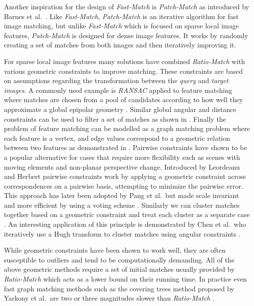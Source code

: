 \documentclass[runningheads]{llncs}
\begin{document}
Another inspiration for the design of \emph{Fast-Match} is \emph{Patch-Match} as introduced by Barnes et al.~\cite{barnes2009patchmatch}. Like \emph{Fast-Match}, \emph{Patch-Match} is an iterative algorithm for fast image matching, but unlike \emph{Fast-Match} which is focused on sparse local image features, \emph{Patch-Match} is designed for dense image features. It works by randomly creating a set of matches from both images and then iteratively improving it.

For sparse local image features many solutions have combined \emph{Ratio-Match} with various geometric constraints to improve matching. These constraints are based on assumptions regarding the transformation between the \emph{query} and \emph{target images}. A commonly used example is \emph{RANSAC} applied to feature matching where matches are chosen from a pool of candidates according to how well they approximate a global epipolar geometry \cite{fischler1981ransac,torr2000mlesac,szeliski2010}. Similar global angular and distance constraints can be used to filter a set of matches as shown in \cite{kim2008efficient,schmid1997local}. Finally the problem of feature matching can be modelled as a graph matching problem where each feature is a vertex, and edge values correspond to a geometric relation between two features as demonstrated in \cite{torresani2008feature,yarkony2010covering,cho2010reweighted}. Pairwise constraints have shown to be a popular alternative for cases that require more flexibility such as scenes with moving elements and non-planar perspective change. Introduced by Leordeanu and Herbert \cite{leordeanu2005spectral} pairwise constraints work by applying a geometric constraint across correspondences on a pairwise basis, attempting to minimize the pairwise error. This approach has later been adopted by Pang et al.\ but made scale invariant and more efficient by using a voting scheme \cite{yuan2012efficient,pang2012scale}. Similarly we can cluster matches together based on a geometric constraint and treat each cluster as a separate case \cite{cho2009feature,wu2011robust}. An interesting application of this principle is demonstrated by Chen et al.\ who iteratively use a Hugh transform to cluster matches using angular constraints \cite{chen2013robust}.

While geometric constraints have been shown to work well, they are often susceptible to outliers and tend to be computationally demanding. All of the above geometric methods require a set of initial matches usually provided by \emph{Ratio-Match} which acts as a lower bound on their running time. In practice even fast graph matching methods such as the covering trees method proposed by Yarkony et al.\ are two or three magnitudes slower than \emph{Ratio-Match} \cite{yarkony2010covering}.
\end{document}
